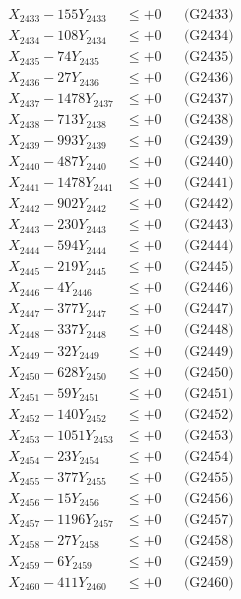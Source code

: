 \documentclass[a4paper,10pt]{article}
\begin{document}
{\begin{align}
X_{2433} - 155Y_{2433} &\leq +0 && \text{(G2433)} \\
X_{2434} - 108Y_{2434} &\leq +0 && \text{(G2434)} \\
X_{2435} - 74Y_{2435} &\leq +0 && \text{(G2435)} \\
X_{2436} - 27Y_{2436} &\leq +0 && \text{(G2436)} \\
X_{2437} - 1478Y_{2437} &\leq +0 && \text{(G2437)} \\
X_{2438} - 713Y_{2438} &\leq +0 && \text{(G2438)} \\
X_{2439} - 993Y_{2439} &\leq +0 && \text{(G2439)} \\
X_{2440} - 487Y_{2440} &\leq +0 && \text{(G2440)} \\
\allowbreak
X_{2441} - 1478Y_{2441} &\leq +0 && \text{(G2441)} \\
X_{2442} - 902Y_{2442} &\leq +0 && \text{(G2442)} \\
X_{2443} - 230Y_{2443} &\leq +0 && \text{(G2443)} \\
X_{2444} - 594Y_{2444} &\leq +0 && \text{(G2444)} \\
X_{2445} - 219Y_{2445} &\leq +0 && \text{(G2445)} \\
X_{2446} - 4Y_{2446} &\leq +0 && \text{(G2446)} \\
X_{2447} - 377Y_{2447} &\leq +0 && \text{(G2447)} \\
X_{2448} - 337Y_{2448} &\leq +0 && \text{(G2448)} \\
X_{2449} - 32Y_{2449} &\leq +0 && \text{(G2449)} \\
X_{2450} - 628Y_{2450} &\leq +0 && \text{(G2450)} \\
\allowbreak
X_{2451} - 59Y_{2451} &\leq +0 && \text{(G2451)} \\
X_{2452} - 140Y_{2452} &\leq +0 && \text{(G2452)} \\
X_{2453} - 1051Y_{2453} &\leq +0 && \text{(G2453)} \\
X_{2454} - 23Y_{2454} &\leq +0 && \text{(G2454)} \\
X_{2455} - 377Y_{2455} &\leq +0 && \text{(G2455)} \\
X_{2456} - 15Y_{2456} &\leq +0 && \text{(G2456)} \\
X_{2457} - 1196Y_{2457} &\leq +0 && \text{(G2457)} \\
X_{2458} - 27Y_{2458} &\leq +0 && \text{(G2458)} \\
X_{2459} - 6Y_{2459} &\leq +0 && \text{(G2459)} \\
X_{2460} - 411Y_{2460} &\leq +0 && \text{(G2460)} \\

\end{align}}
\end{document}
